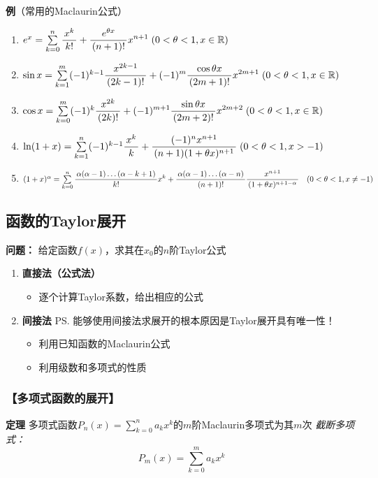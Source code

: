 {\b
{\bf 例}（常用的Maclaurin公式）
\begin{enumerate}[(1)]
  \setlength{\itemindent}{1cm}
  \item {$e^x =\sum\limits_{k=0}^n\displaystyle\frac{\,{x^k}\,}{\,{k!}\,}
  +\displaystyle\frac{\,{e^{\theta x}}\,}{\,{(n+1)!}\,}x^{n+1}\;
  (0<\theta<1,x\in\mathbb{R})$}
  \item {$\sin x
  =\sum\limits_{k=1}^m(-1)^{k-1}\displaystyle\frac{\,{x^{2k-1}}\,}{\,{(2k-1)!}\,} 
  +(-1)^m\displaystyle\frac{\,{\cos\theta x}\,}{\,{(2m+1)!}\,}x^{2m+1}\;
  (0<\theta<1,x\in\mathbb{R})$}
  \item {$\cos x= \sum\limits_{k=0}^m(-1)^{k}\displaystyle\frac{\,{x^{2k}}\,}{\,{(2k)!}\,}
  +(-1)^{m+1}\displaystyle\frac{\,{\sin\theta
  x}\,}{\,{(2m+2)!}\,}x^{2m+2}\; (0<\theta<1,x\in\mathbb{R})$}
  \item
  {$\ln(1+x) =\sum\limits_{k=1}^n(-1)^{k-1}\displaystyle\frac{\,{x^k}\,}{\,{k}\,}
  +\displaystyle\frac{\,{(-1)^nx^{n+1}}\,}{\,{(n+1)(1+\theta
  x)^{n+1}}\,}\; (0<\theta<1,x>-1)$} 
  \item
  {$(1+x)^\alpha =\sum\limits_{k=0}^n
  \displaystyle\frac{\,{\alpha(\alpha-1)\ldots(\alpha-k+1)}\,}{\,{k!}\,}x^k
	 +\displaystyle\frac{\,{\alpha(\alpha-1)\ldots(\alpha-n)}\,}{\,{(n+1)!}\,}\displaystyle\frac{\,{x^{n+1}}\,}{\,{(1+\theta
	x)^{n+1-\alpha}}\,}\quad (0<\theta<1,x\ne -1)$}
\end{enumerate}
}

\subsection{函数的Taylor展开}

{\bf 问题：}{ 给定函数$f(x)$，求其在$x_0$的$n$阶Taylor公式} 
\begin{enumerate}[(1)]
  \setlength{\itemindent}{1cm}
  \item {\bf 直接法（公式法）} 
  \begin{itemize}
    \item 逐个计算Taylor系数，给出相应的公式 
  \end{itemize}
  \item {\bf 间接法} \ps{能够使用间接法求展开的根本原因是Taylor展开具有唯一性！}
  \begin{itemize}
    \item 利用已知函数的Maclaurin公式 
    \item 利用级数和多项式的性质
  \end{itemize}
\end{enumerate}

\subsubsection{【多项式函数的展开】}

{\bf 定理}
多项式函数$P_n(x)=\sum\limits_{k=0}^na_kx^k$的$m$阶Maclaurin多项式为其$m$次
{\it 截断多项式：} 
$${P_m(x)=\sum\limits_{k=0}^ma_kx^k}$$

